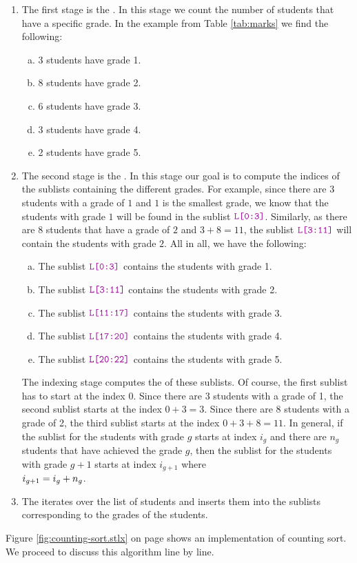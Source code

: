 \begin{enumerate}
\item The first stage is the .  In this stage we count the number of students
      that have a specific grade.  In the example from Table \ref{tab:marks} we find the following:
      \begin{enumerate}[(a)]
      \item 3 students have grade 1.
      \item 8 students have grade 2.
      \item 6 students have grade 3.
      \item 3 students have grade 4.
      \item 2 students have grade 5.
      \end{enumerate}
\item The second stage is the .  In this stage our goal is to compute the indices of the
      sublists containing the different grades.  For example, since there are 3 students with a grade of $1$
      and $1$ is the smallest grade, we know that the students with grade $1$ will be found in the sublist
      $\mytt{L[0:3]}$.  Similarly, as there are $8$ students that have a grade of $2$ and $3 + 8 = 11$,
      the sublist $\mytt{L[3:11]}$ will contain the students with grade $2$.
      All in all, we have the following:
      \begin{enumerate}[(a)]
      \item The sublist $\mytt{L[0:3]}$ contains the students with grade 1.
      \item The sublist $\mytt{L[3:11]}$ contains the students with grade 2.
      \item The sublist $\mytt{L[11:17]}$ contains the students with grade 3.
      \item The sublist $\mytt{L[17:20]}$ contains the students with grade 4.
      \item The sublist $\mytt{L[20:22]}$ contains the students with grade 5.
      \end{enumerate}
      The indexing stage computes the  of these sublists.
      Of course,  the first sublist has to start at the index $0$.  Since there are 3 students with a grade of 1,
      the second sublist starts at the index $0 + 3 = 3$.  Since there are 8 students with a grade of 2, the third
      sublist starts at the index $0 + 3 + 8 = 11$.  In general, if the sublist for the students with grade $g$
      starts at index $i_g$ and there are $n_g$ students that have achieved the grade $g$, then the sublist for the
      students with grade $g+1$ starts at index $i_{g+1}$ where
      \\[0.2cm]
      \hspace*{1.3cm}
      $\displaystyle i_{g+1} = i_g + n_g$.
\item The  iterates over the list of students and inserts them into the sublists
      corresponding to the grades of the students.
\end{enumerate}
Figure \ref{fig:counting-sort.stlx} on page \pageref{fig:counting-sort.stlx} shows an implementation of
counting sort.  We proceed to discuss this algorithm line by line.

